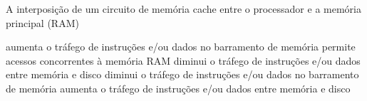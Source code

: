 \documentclass[12pt, addpoints]{exam}
\begin{document}
\begin{questions}
\question
A interposição de um circuito de memória cache entre o processador e a memória principal (RAM)
\begin{choices}
\choice aumenta o tráfego de instruções e/ou dados no barramento de memória
\choice permite acessos concorrentes à memória RAM
\choice diminui o tráfego de instruções e/ou dados entre memória e disco
\choice diminui o tráfego de instruções e/ou dados no barramento de memória
\choice aumenta o tráfego de instruções e/ou dados entre memória e disco
\end{choices}



    \end{questions}
    
\end{document}

